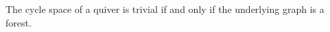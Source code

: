\begin{corollary}\label{Arden24v2-cor-3.2}
\label{Arden24v2-cor:forest}
The cycle space of a quiver is trivial if and only if the underlying graph is a forest.
\end{corollary}